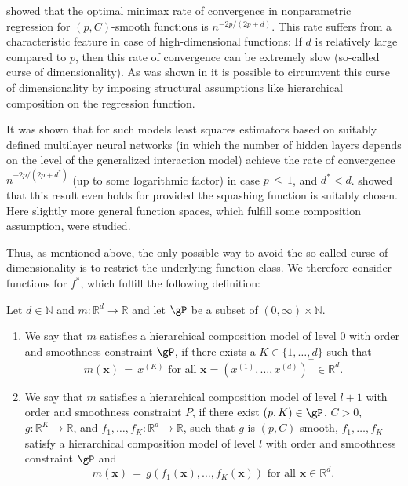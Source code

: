 \documentclass[twoside,11pt]{article}
\begin{document}
\cite{stone1982optimal} showed that the optimal minimax rate of convergence in nonparametric regression for \( (p, C) \)-smooth functions is \( n^{-2p/(2p+d)} \). This rate suffers from a characteristic feature in case of high-dimensional functions: If \( d \) is relatively large compared to \( p \), then this rate of convergence can be extremely slow (so-called curse of dimensionality). As was shown in \cite{stone1985additive, stone1994use} it is possible to circumvent this curse of dimensionality by imposing structural assumptions like hierarchical composition on the regression function. 

It was shown that for such models least squares estimators based on suitably defined multilayer neural networks (in which the number of hidden layers depends on the level of the generalized interaction model) achieve the rate of convergence \( n^{-2p/(2p+d^*)} \) (up to some logarithmic factor) in case \( p \,\leq\, 1 \), and $d^* < d$. \cite{bauer2019deep} showed that this result even holds for provided the squashing function is suitably chosen. Here slightly more general function spaces, which fulfill
some composition assumption, were studied.

Thus, as mentioned above, the only possible way to avoid the so-called curse of dimensionality is to restrict the underlying function class. We therefore consider functions for $f^*$, which fulfill the following definition:

\begin{definition}
\label{def_h_c_model}
Let \( d \in \mathbb{N} \) and \( m: \mathbb{R}^d \rightarrow \mathbb{R} \) and let \( \gP \) be a subset of \( (0,\infty) \times \mathbb{N} \).
\begin{enumerate}[label=\alph*)]
  \item We say that \( m \) satisfies a hierarchical composition model of level 0 with order and smoothness constraint \( \gP \), if there exists a \( K \in \{1,\ldots,d\} \) such that
  \[ m(\mathbf{x}) \,=\, x^{(K)} \text{ for all } \mathbf{x} = (x^{(1)},\ldots,x^{(d)})^\top \in \mathbb{R}^d. \]
  \item We say that \( m \) satisfies a hierarchical composition model of level \( l+1 \) with order and smoothness constraint \( P \), if there exist \( (p,K) \in \gP \), \( C > 0 \), \( g : \mathbb{R}^K \rightarrow \mathbb{R} \), and \( f_1,\ldots,f_K : \mathbb{R}^d \rightarrow \mathbb{R} \), such that \( g \) is \( (p,C) \)-smooth, \( f_1,\ldots,f_K \) satisfy a hierarchical composition model of level \( l \) with order and smoothness constraint \( \gP \) and
  \[ m(\mathbf{x}) \,=\, g(f_1(\mathbf{x}),\ldots,f_K(\mathbf{x})) \text{ for all } \mathbf{x} \in \mathbb{R}^d. \]
\end{enumerate}
\end{definition}
\end{document}
